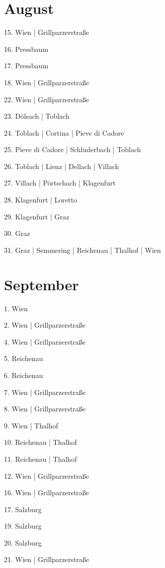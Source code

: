 \documentclass[twoside=false,titlepage=false,open=any, parskip=never, fontsize=10pt, headings=small, chapterprefix=false, appendixprefix=false, DIV=15]{scrbook}
\begin{document}
\begin{multicols}{3}
            \section*{August}
            15. Wien | Grillparzerstraße\par
            16. Pressbaum\par
            17. Pressbaum\par
            18. Wien | Grillparzerstraße\par
            22. Wien | Grillparzerstraße\par
            23. Dölsach | Toblach\par
            24. Toblach | Cortina | Pieve di Cadore\par
            25. Pieve di Cadore | Schluderbach | Toblach\par
            26. Toblach | Lienz | Dellach | Villach\par
            27. Villach | Pörtschach | Klagenfurt\par
            28. Klagenfurt | Loretto\par
            29. Klagenfurt | Graz\par
            30. Graz\par
            31. Graz | Semmering | Reichenau | Thalhof | Wien\par
            \section*{September}
            1. Wien\par
            2. Wien | Grillparzerstraße\par
            4. Wien | Grillparzerstraße\par
            5. Reichenau\par
            6. Reichenau\par
            7. Wien | Grillparzerstraße\par
            8. Wien | Grillparzerstraße\par
            9. Wien | Thalhof\par
            10. Reichenau | Thalhof\par
            11. Reichenau | Thalhof\par
            12. Wien | Grillparzerstraße\par
            16. Wien | Grillparzerstraße\par
            17. Salzburg\par
            19. Salzburg\par
            20. Salzburg\par
            21. Wien | Grillparzerstraße\par

\end{multicols}
\end{document}
